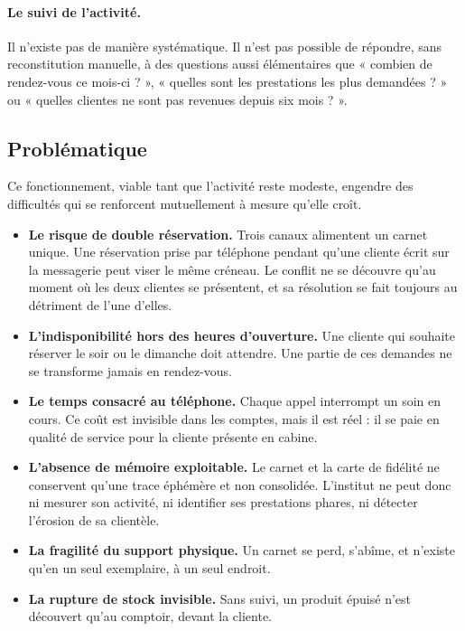 \paragraph{Le suivi de l'activité.} Il n'existe pas de manière systématique. Il
n'est pas possible de répondre, sans reconstitution manuelle, à des questions
aussi élémentaires que « combien de rendez-vous ce mois-ci ? », « quelles sont
les prestations les plus demandées ? » ou « quelles clientes ne sont pas
revenues depuis six mois ? ».

\subsection{Problématique}

Ce fonctionnement, viable tant que l'activité reste modeste, engendre des
difficultés qui se renforcent mutuellement à mesure qu'elle croît.

\begin{itemize}[leftmargin=1.2cm]
  \item \textbf{Le risque de double réservation.} Trois canaux alimentent un
  carnet unique. Une réservation prise par téléphone pendant qu'une cliente
  écrit sur la messagerie peut viser le même créneau. Le conflit ne se découvre
  qu'au moment où les deux clientes se présentent, et sa résolution se fait
  toujours au détriment de l'une d'elles.

  \item \textbf{L'indisponibilité hors des heures d'ouverture.} Une cliente qui
  souhaite réserver le soir ou le dimanche doit attendre. Une partie de ces
  demandes ne se transforme jamais en rendez-vous.

  \item \textbf{Le temps consacré au téléphone.} Chaque appel interrompt un
  soin en cours. Ce coût est invisible dans les comptes, mais il est réel : il
  se paie en qualité de service pour la cliente présente en cabine.

  \item \textbf{L'absence de mémoire exploitable.} Le carnet et la carte de
  fidélité ne conservent qu'une trace éphémère et non consolidée. L'institut ne
  peut donc ni mesurer son activité, ni identifier ses prestations phares, ni
  détecter l'érosion de sa clientèle.

  \item \textbf{La fragilité du support physique.} Un carnet se perd, s'abîme,
  et n'existe qu'en un seul exemplaire, à un seul endroit.

  \item \textbf{La rupture de stock invisible.} Sans suivi, un produit épuisé
  n'est découvert qu'au comptoir, devant la cliente.
\end{itemize}

